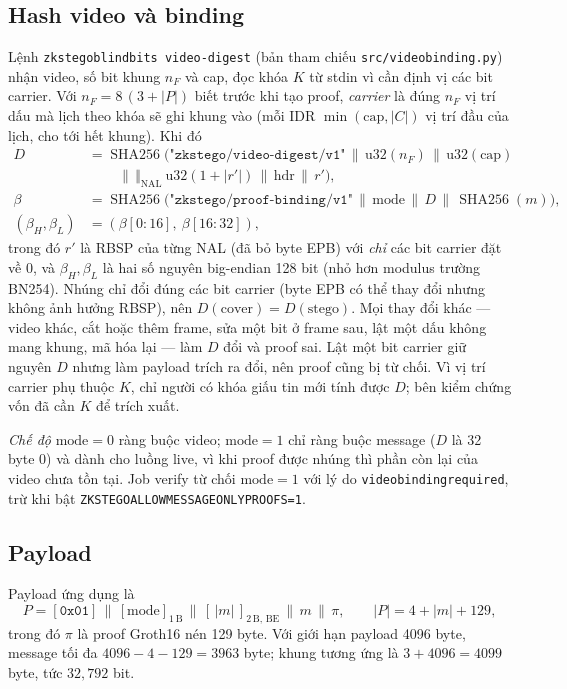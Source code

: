 \documentclass[11pt,a4paper]{article}
\renewcommand{\_}{\origunderscore\allowbreak}
\begin{document}
\subsection{Hash video và binding}
Lệnh \texttt{zkstego\_blind\_bits video-digest} (bản tham chiếu \texttt{src/video\_binding.py}) nhận video, số bit khung $n_F$ và cap, đọc khóa $K$ từ stdin vì cần định vị các bit carrier. Với $n_F=8\,(3+|P|)$ biết trước khi tạo proof, \emph{carrier} là đúng $n_F$ vị trí dấu mà lịch theo khóa sẽ ghi khung vào (mỗi IDR $\min(\text{cap},|C|)$ vị trí đầu của lịch, cho tới hết khung). Khi đó
\begin{align*}
D &= \operatorname{SHA256}\Big(\texttt{"zkstego/video-digest/v1"}\,\|\,\mathrm{u32}(n_F)\,\|\,\mathrm{u32}(\text{cap})\\
&\qquad\,\|\,\textstyle\big\Vert_{\text{NAL}}\ \mathrm{u32}(1+|r'|)\,\|\,\mathrm{hdr}\,\|\,r'\Big),\\
\beta &= \operatorname{SHA256}\big(\texttt{"zkstego/proof-binding/v1"}\,\|\,\mathrm{mode}\,\|\,D\,\|\,\operatorname{SHA256}(m)\big),\\
(\beta_H,\beta_L) &= (\beta[0{:}16],\ \beta[16{:}32]),
\end{align*}
trong đó $r'$ là RBSP của từng NAL (đã bỏ byte EPB) với \emph{chỉ} các bit carrier đặt về 0, và $\beta_H,\beta_L$ là hai số nguyên big-endian 128 bit (nhỏ hơn modulus trường BN254). Nhúng chỉ đổi đúng các bit carrier (byte EPB có thể thay đổi nhưng không ảnh hưởng RBSP), nên $D(\text{cover})=D(\text{stego})$. Mọi thay đổi khác --- video khác, cắt hoặc thêm frame, sửa một bit ở frame sau, lật một dấu không mang khung, mã hóa lại --- làm $D$ đổi và proof sai. Lật một bit carrier giữ nguyên $D$ nhưng làm payload trích ra đổi, nên proof cũng bị từ chối. Vì vị trí carrier phụ thuộc $K$, chỉ người có khóa giấu tin mới tính được $D$; bên kiểm chứng vốn đã cần $K$ để trích xuất.

\emph{Chế độ} $\mathrm{mode}=0$ ràng buộc video; $\mathrm{mode}=1$ chỉ ràng buộc message ($D$ là 32 byte 0) và dành cho luồng live, vì khi proof được nhúng thì phần còn lại của video chưa tồn tại. Job verify từ chối $\mathrm{mode}=1$ với lý do \texttt{video\_binding\_required}, trừ khi bật \texttt{ZK\_STEGO\_ALLOW\_MESSAGE\_ONLY\_PROOFS=1}.

\subsection{Payload}
Payload ứng dụng là
\[
P=[\texttt{0x01}]\,\|\,[\mathrm{mode}]_{1\,\mathrm{B}}\,\|\,[\,|m|\,]_{2\,\mathrm{B,\,BE}}\,\|\,m\,\|\,\pi,\qquad |P|=4+|m|+129,
\]
trong đó $\pi$ là proof Groth16 nén 129 byte. Với giới hạn payload 4096 byte, message tối đa $4096-4-129=3963$ byte; khung tương ứng là $3+4096=4099$ byte, tức $32{,}792$ bit.
\end{document}
